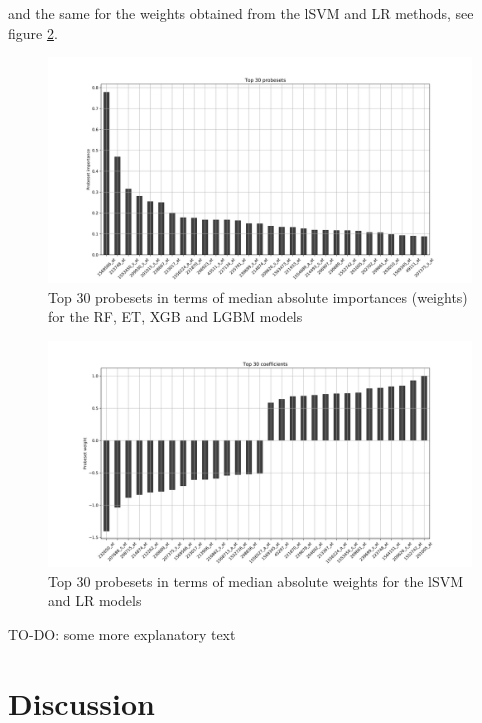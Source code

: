 \documentclass[a4paper,10pt]{article}
\begin{document}
and the same for the weights obtained from the lSVM and LR methods, see figure \ref{fig:coeffsFromModels}.
%
\begin{figure}[htp!]
\centering
\includegraphics[width=12cm]{images/top30_importances_FDR005}
\caption{Top $30$ probesets in terms of median absolute importances (weights) for the RF, ET, XGB and LGBM models}
\label{fig:weightsFromModels}
\end{figure}
%
\begin{figure}[htp!]
\centering
\includegraphics[width=12cm]{images/top30_weights_FDR005}
\caption{Top $30$ probesets in terms of median absolute weights for the lSVM and LR models}
\label{fig:coeffsFromModels}
\end{figure}
%
TO-DO: some more explanatory text
%
\section{Discussion}
\end{document}
